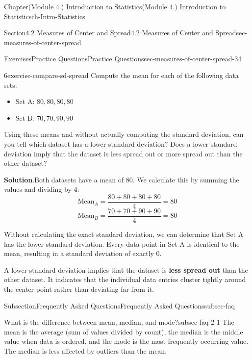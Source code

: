\documentclass[oneside,10pt,]{book}
\newcommand{\blocktitlefont}{\relax}
\newcommand{\ptxlistdisc}{\raisebox{0.3ex}{\textbullet}}
\newcommand{\terminology}[1]{\textbf{#1}}
\begin{document}
\begin{chapterptx}{Chapter}{(Module 4.) Introduction to Statistics}{}{(Module 4.) Introduction to Statistics}{}{}{ch-Intro-Statistics}
\begin{sectionptx}{Section}{4.2 Measures of Center and Spread}{}{4.2 Measures of Center and Spread}{}{}{sec-measures-of-center-spread}
\begin{exercises-subsection}{Exercises}{Practice Questions}{}{Practice Questions}{}{}{sec-measures-of-center-spread-34}
\begin{divisionexercise}{6}{}{}{exercise-compare-sd-spread}
Compute the mean for each of the following data sets:%
\begin{itemize}[label=\ptxlistdisc]
\item{}Set A: \(80, 80, 80, 80\)%
\item{}Set B: \(70, 70, 90, 90\)%
\end{itemize}
Using these means and without actually computing the standard deviation, can you tell which dataset has a lower standard deviation? Does a lower standard deviation imply that the dataset is less spread out or more spread out than the other dataset?%
\par\smallskip%
\noindent\textbf{\blocktitlefont Solution}.\hypertarget{exercise-compare-sd-spread-2}{}\quad{}Both datasets have a mean of \(80\). We calculate this by summing the values and dividing by \(4\):%
\begin{equation*}
\text{Mean}_A = \frac{80+80+80+80}{4} = 80
\end{equation*}
%
\begin{equation*}
\text{Mean}_B = \frac{70+70+90+90}{4} = 80
\end{equation*}
%
\par
Without calculating the exact standard deviation, we can determine that Set A has the lower standard deviation. Every data point in Set A is identical to the mean, resulting in a standard deviation of exactly \(0\).%
\par
A lower standard deviation implies that the dataset is \terminology{less spread out} than the other dataset. It indicates that the individual data entries cluster tightly around the center point rather than deviating far from it.%
\end{divisionexercise}%
\end{exercises-subsection}
%
%
\typeout{************************************************}
\typeout{************************************************}
%
\begin{subsectionptx}{Subsection}{Frequently Asked Questions}{}{Frequently Asked Questions}{}{}{subsec-faq}
%
\begin{descriptionlist}
\begin{dlimedium}{What is the difference between mean, median, and mode?}{subsec-faq-2-1}%
The mean is the average (sum of values divided by count), the median is the middle value when data is ordered, and the mode is the most frequently occurring value. The median is less affected by outliers than the mean.%
\end{dlimedium}%

\end{descriptionlist}
\end{subsectionptx}
\end{sectionptx}
\end{chapterptx}
\end{document}
